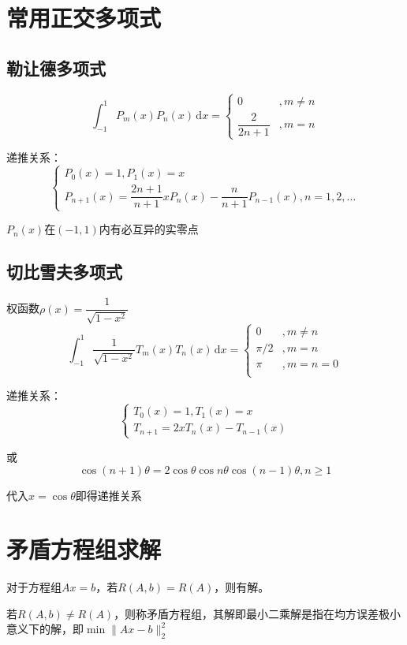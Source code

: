 \documentclass[UTF8,a4paper,11pt,oneside]{ctexbook}
\begin{document}
\section{常用正交多项式}

\subsection{勒让德多项式}
\[
\int_{-1}^1P_m(x)P_n(x)\,\mathrm{d}x=
\begin{cases}
    0 & ,m\neq n\\
    \dfrac{2}{2n+1} & ,m=n
\end{cases}
\]

递推关系：
\[
\begin{cases}
    P_0(x)=1,P_1(x)=x\\
    P_{n+1}(x)=\dfrac{2n+1}{n+1}xP_n(x)-\dfrac{n}{n+1}P_{n-1}(x),n=1,2,\ldots
\end{cases}
\]

\(P_n(x)\)在\((-1,1)\)内有必互异的实零点

\subsection{切比雪夫多项式}

权函数\(\rho(x)=\dfrac{1}{\sqrt{1-x^2}}\)
\[
\int_{-1}^{1}\frac{1}{\sqrt{1-x^2}}T_m(x)T_n(x)\,\mathrm{d}x=
\begin{cases}
    0 & ,m\neq n\\
    \pi/2 & ,m=n\\
    \pi & ,m=n=0\\
\end{cases}
\]

递推关系：
\[
\begin{cases}
    T_0(x)=1,T_1(x)=x\\
    T_{n+1}=2xT_n(x)-T_{n-1}(x)
\end{cases}
\]

或
\[
\cos(n+1)\theta=2\cos\theta\cos n\theta\cos(n-1)\theta,n\geq1
\]

代入\(x=\cos\theta\)即得递推关系

\section{矛盾方程组求解}

对于方程组\(Ax=b\)，若\(R(A,b)=R(A)\)，则有解。

若\(R(A,b)\neq R(A)\)，则称矛盾方程组，其解即最小二乘解是指在均方误差极小意义下的解，即\(\min\|Ax-b\|_2^2\)
\end{document}
